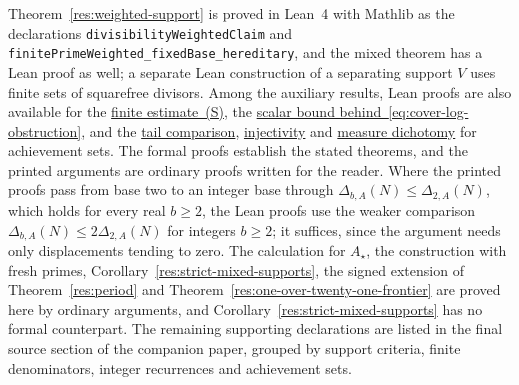 \documentclass[11pt]{article}
\begin{document}
\evidenceparagraph{\evidencerecordurl}
Theorem~\ref{res:weighted-support} is proved in Lean~4 with Mathlib as
the declarations \texttt{divisibilityWeightedClaim} and
\texttt{finitePrimeWeighted\_fixedBase\_hereditary}, and the mixed
theorem has a Lean proof as well; a separate Lean construction of a
separating support $V$ uses finite sets of squarefree divisors. Among
the auxiliary results, Lean proofs are also available for the
\href{https://github.com/wcook04/plectis-erdos/blob/c91562bd574a387cde904481e609c7b4cacebb14/lean/ErdosProblems/Erdos257/PaperCompleteR8/DyadicKernel.lean\#L206}{finite estimate~(S)}, the
\href{https://github.com/wcook04/plectis-erdos/blob/c91562bd574a387cde904481e609c7b4cacebb14/lean/ErdosProblems/Erdos257/PaperCompleteR7/CoverKernel.lean\#L170}{scalar bound behind~\eqref{eq:cover-log-obstruction}},
and the \href{https://github.com/wcook04/plectis-erdos/blob/c91562bd574a387cde904481e609c7b4cacebb14/lean/ErdosProblems/Erdos257/MersenneSubseriesRigidity.lean\#L30}{tail comparison},
\href{https://github.com/wcook04/plectis-erdos/blob/c91562bd574a387cde904481e609c7b4cacebb14/lean/ErdosProblems/Erdos257/MersenneSubseriesRigidity.lean\#L54}{injectivity} and
\href{https://github.com/wcook04/plectis-erdos/blob/c91562bd574a387cde904481e609c7b4cacebb14/lean/ErdosProblems/Erdos257/MersenneSubseriesRigidity.lean\#L397}{measure dichotomy} for achievement sets. The
formal proofs establish the stated theorems, and the printed arguments
are ordinary proofs written for the reader. Where the printed proofs pass
from base two to an integer base through
$\Delta_{b,A}(N)\le\Delta_{2,A}(N)$, which holds for every real $b\ge2$,
the Lean proofs use the weaker comparison
$\Delta_{b,A}(N)\le2\Delta_{2,A}(N)$ for integers $b\ge2$; it suffices,
since the argument needs only displacements tending to zero. The calculation for
$A_\star$, the construction with fresh primes,
Corollary~\ref{res:strict-mixed-supports}, the signed extension of
Theorem~\ref{res:period} and Theorem~\ref{res:one-over-twenty-one-frontier}
are proved here by ordinary arguments, and
Corollary~\ref{res:strict-mixed-supports} has no formal counterpart.
The remaining supporting declarations are listed in
{the final source section of the companion paper}, grouped by support
criteria, finite denominators, integer recurrences and achievement sets.
\end{document}
